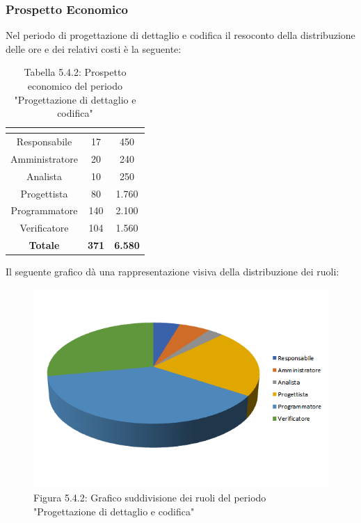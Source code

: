 \subsubsection{Prospetto Economico}
Nel periodo di progettazione di dettaglio e codifica il resoconto della distribuzione delle ore e dei relativi costi è la seguente:

\renewcommand{\arraystretch}{1.5}
\begin{table}[H]
\begin{center}
\begin{tabular}{|c|c|c|}
\hline
\rowcolor{title_row}
\textbf{\color{title_text}{Ruolo}}  & \textbf{\color{title_text}{Ore}} & \textbf{\color{title_text}{Costo in \euro}} \\ \hline
Responsabile    & 17           & 450                 \\ \hline
Amministratore  & 20           & 240                 \\ \hline
Analista        & 10           & 250                 \\ \hline
Progettista     & 80           & 1.760                \\ \hline
Programmatore   & 140          & 2.100                \\ \hline
Verificatore    & 104          & 1.560                \\ \hline
\textbf{Totale} & \textbf{371}    & \textbf{6.580}           \\ \hline
\end{tabular}
\caption{Tabella 5.4.2: Prospetto economico del periodo "Progettazione di dettaglio e codifica"\label{}}
\end{center}
\end{table}
\renewcommand{\arraystretch}{1}

Il seguente grafico dà una rappresentazione visiva della distribuzione dei ruoli: \\
\begin{figure} [H]
	\centering
	\includegraphics[scale=1]{Res/ExcelGrafici/Grafici/CodificaRuoli.png}
	\caption{Figura 5.4.2: Grafico suddivisione dei ruoli del periodo "Progettazione di dettaglio e codifica"}\label{}
\end{figure}

\pagebreak
